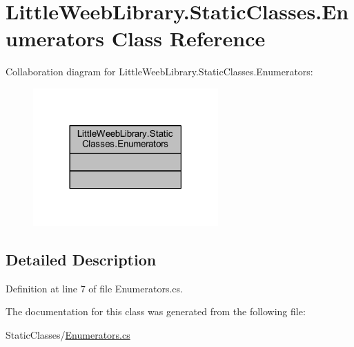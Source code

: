 \hypertarget{class_little_weeb_library_1_1_static_classes_1_1_enumerators}{}\section{Little\+Weeb\+Library.\+Static\+Classes.\+Enumerators Class Reference}
\label{class_little_weeb_library_1_1_static_classes_1_1_enumerators}


Collaboration diagram for Little\+Weeb\+Library.\+Static\+Classes.\+Enumerators\+:\nopagebreak
\begin{figure}[H]
\begin{center}
\leavevmode
\includegraphics[width=201pt]{class_little_weeb_library_1_1_static_classes_1_1_enumerators__coll__graph}
\end{center}
\end{figure}


\subsection{Detailed Description}


Definition at line 7 of file Enumerators.\+cs.



The documentation for this class was generated from the following file\+:\begin{DoxyCompactItemize}
\item 
Static\+Classes/\mbox{\hyperlink{_enumerators_8cs}{Enumerators.\+cs}}\end{DoxyCompactItemize}
